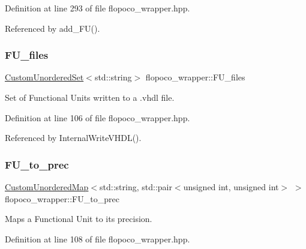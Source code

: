 Definition at line 293 of file flopoco\+\_\+wrapper.\+hpp.



Referenced by add\+\_\+\+F\+U().

\mbox{\label{classflopoco__wrapper_ae066c877bb6b1ddc5a887c97119a4381}} 
\subsubsection{\texorpdfstring{F\+U\+\_\+files}{FU\_files}}
{\footnotesize\ttfamily \hyperlink{classCustomUnorderedSet}{Custom\+Unordered\+Set}$<$std\+::string$>$ flopoco\+\_\+wrapper\+::\+F\+U\+\_\+files\hspace{0.3cm}{\ttfamily [private]}}



Set of Functional Units written to a .vhdl file. 



Definition at line 106 of file flopoco\+\_\+wrapper.\+hpp.



Referenced by Internal\+Write\+V\+H\+D\+L().

\mbox{\label{classflopoco__wrapper_a60ec3d02b4bbc3dbeaa0115db26357db}} 
\subsubsection{\texorpdfstring{F\+U\+\_\+to\+\_\+prec}{FU\_to\_prec}}
{\footnotesize\ttfamily \hyperlink{custom__map_8hpp_ad1ed68f2ff093683ab1a33522b144adc}{Custom\+Unordered\+Map}$<$std\+::string, std\+::pair$<$unsigned int, unsigned int$>$ $>$ flopoco\+\_\+wrapper\+::\+F\+U\+\_\+to\+\_\+prec\hspace{0.3cm}{\ttfamily [private]}}



Maps a Functional Unit to its precision. 



Definition at line 108 of file flopoco\+\_\+wrapper.\+hpp.



